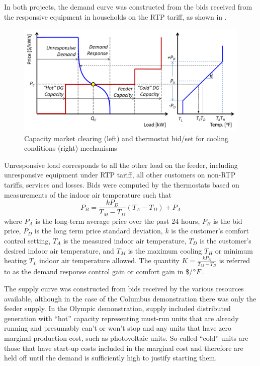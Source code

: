 In both projects, the demand curve was constructed from the bids received from the responsive equipment in households on the RTP tariff, as shown in .
\begin{figure}[ht]
	\centering
	\includegraphics[width=6in]{market_clearing.png}
	\caption{Capacity market clearing (left) and thermostat bid/set for cooling conditions (right) mechanisms}
	\label{fig:market_clearing}
\end{figure}
Unresponsive load corresponds to all the other load on the feeder, including unresponsive equipment under RTP tariff, all other customers on non-RTP tariffs, services and losses.  Bids were computed by the thermostats based on measurements of the indoor air temperature such that
\begin{equation}
	P_B = \frac{k P_D }{T_M-T_D}(T_A - T_D) + P_A
\end{equation}
where $P_A$ is the long-term average price over the past 24 hours, $P_B$ is the bid price, $P_D$ is the long term price standard deviation, $k$ is the customer's comfort control setting, $T_A$ is the measured indoor air temperature,  $T_D$ is the customer's desired indoor air temperature, and $T_M$ is the maximum cooling $T_H$ or minimum heating $T_L$ indoor air temperature allowed. The quantity $K=\frac{k P_D }{T_M-T_D}$ is referred to as the demand response control gain or comfort gain in \$/$^\circ F$.

The supply curve was constructed from bids received by the various resources available, although in the case of the Columbus demonstration there was only the feeder supply. In the Olympic demonstration, supply included distributed generation with ``hot'' capacity representing must-run units that are already running and presumably can't or won't stop and any units that have zero marginal production cost, such as photovoltaic units.  So called ``cold'' units are those that have start-up costs included in the marginal cost and therefore are held off until the demand is sufficiently high to justify starting them.

